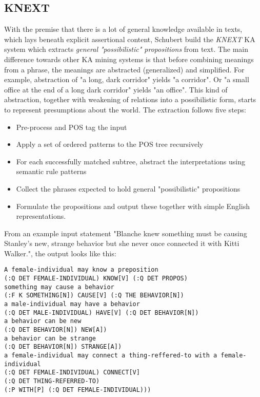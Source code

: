 \subsection{KNEXT}
\label{section:r:knext}
With the premise that there is a lot of general knowledge available in texts,
which lays beneath explicit assertional content, Schubert build the \emph{KNEXT} KA system \parencite{Schubert2002} which extracts \emph{general "possibilistic" propositions} from text. The main difference towards other KA mining systems is
that before combining meanings from a phrase, the meanings are abstracted
(generalized) and simplified. For example, abstraction of "a long, dark corridor"
yields "a corridor". Or "a small office at the end of a long dark corridor" 
yields "an office". This kind of abstraction, together with weakening of 
relations into a possibilistic form, starts to represent presumptions about the
world. 
The extraction follows five steps:
\begin{itemize}
    \item Pre-process and POS tag the input
    \item Apply a set of ordered patterns to the POS tree recursively
    \item For each successfully matched subtree, abstract the interpretations
          using semantic rule patterns
    \item Collect the phrases expected to hold general "possibilistic" 
        propositions
    \item Formulate the propositions and output these together with simple
        English representations.
\end{itemize}
From an example input statement "Blanche knew something must be causing 
Stanley's new, strange behavior but she never once connected it with Kitti 
Walker.", the output looks like this:

\lstset{breaklines=true}
\begin{lstlisting}
A female-individual may know a preposition 
(:Q DET FEMALE-INDIVIDUAL) KNOW[V] (:Q DET PROPOS) 
something may cause a behavior
(:F K SOMETHING[N]) CAUSE[V] (:Q THE BEHAVIOR[N])
a male-individual may have a behavior
(:Q DET MALE-INDIVIDUAL) HAVE[V] (:Q DET BEHAVIOR[N])
a behavior can be new
(:Q DET BEHAVIOR[N]) NEW[A])
a behavior can be strange
(:Q DET BEHAVIOR[N]) STRANGE[A])
a female-individual may connect a thing-reffered-to with a female-individual
(:Q DET FEMALE-INDIVIDUAL) CONNECT[V] 
(:Q DET THING-REFERRED-TO) 
(:P WITH[P] (:Q DET FEMALE-INDIVIDUAL)))
\end{lstlisting}

